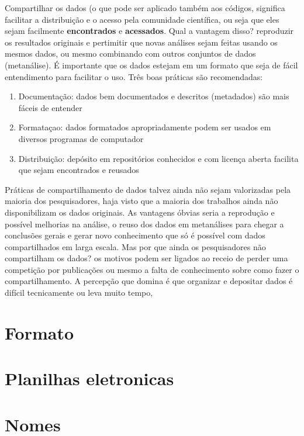 \documentclass[]{book}
\providecommand{\tightlist}{%
  \setlength{\itemsep}{0pt}\setlength{\parskip}{0pt}}
\begin{document}
Compartilhar os dados (o que pode ser aplicado também aos códigos,
significa facilitar a distribuição e o acesso pela comunidade
científica, ou seja que eles sejam facilmente \textbf{encontrados} e
\textbf{acessados}. Qual a vantagem disso? reproduzir os resultados
originais e pertimitir que novas análises sejam feitas usando os mesmos
dados, ou mesmo combinando com outros conjuntos de dados (metanálise). É
importante que os dados estejam em um formato que seja de fácil
entendimento para facilitar o uso. Três boas práticas são recomendadas:

\begin{enumerate}
\def\labelenumi{\arabic{enumi}.}
\tightlist
\item
  Documentação: dados bem documentados e descritos (metadados) são mais
  fáceis de entender
\item
  Formataçao: dados formatados apropriadamente podem ser usados em
  diversos programas de computador
\item
  Distribuição: depósito em repositórios conhecidos e com licença aberta
  facilita que sejam encontrados e reusados
\end{enumerate}

Práticas de compartilhamento de dados talvez ainda não sejam valorizadas
pela maioria dos pesquisadores, haja visto que a maioria dos trabalhos
ainda não disponibilizam os dados originais. As vantagens óbvias seria a
reprodução e possível melhorias na análise, o reuso dos dados em
metanálises para chegar a conclusões gerais e gerar novo conhecimento
que só é possível com dados compartilhados em larga escala. Mas por que
ainda os pesquisadores não compartilham os dados? os motivos podem ser
ligados ao receio de perder uma competição por publicações ou mesmo a
falta de conhecimento sobre como fazer o compartilhamento. A percepção
que domina é que organizar e depositar dados é difícil tecnicamente ou
leva muito tempo,

\hypertarget{formato}{%
\section{Formato}\label{formato}}

\hypertarget{planilhas-eletronicas}{%
\section{Planilhas eletronicas}\label{planilhas-eletronicas}}

\hypertarget{nomes}{%
\section{Nomes}\label{nomes}}
\end{document}
